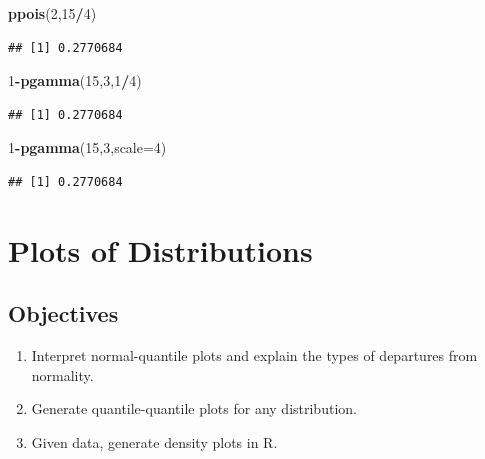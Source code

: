 \documentclass[]{book}
\newenvironment{Shaded}{\begin{snugshade}}{\end{snugshade}}
\newcommand{\KeywordTok}[1]{\textcolor[rgb]{0.13,0.29,0.53}{\textbf{#1}}}
\newcommand{\DataTypeTok}[1]{\textcolor[rgb]{0.13,0.29,0.53}{#1}}
\newcommand{\DecValTok}[1]{\textcolor[rgb]{0.00,0.00,0.81}{#1}}
\newcommand{\OperatorTok}[1]{\textcolor[rgb]{0.81,0.36,0.00}{\textbf{#1}}}
\newcommand{\NormalTok}[1]{#1}
\providecommand{\tightlist}{%
  \setlength{\itemsep}{0pt}\setlength{\parskip}{0pt}}
\theoremstyle{definition}
\theoremstyle{definition}
\theoremstyle{definition}
\theoremstyle{remark}
\begin{document}
\begin{Shaded}
\begin{Highlighting}[]
\KeywordTok{ppois}\NormalTok{(}\DecValTok{2}\NormalTok{,}\DecValTok{15}\OperatorTok{/}\DecValTok{4}\NormalTok{)}
\end{Highlighting}
\end{Shaded}

\begin{verbatim}
## [1] 0.2770684
\end{verbatim}

\begin{Shaded}
\begin{Highlighting}[]
\DecValTok{1}\OperatorTok{-}\KeywordTok{pgamma}\NormalTok{(}\DecValTok{15}\NormalTok{,}\DecValTok{3}\NormalTok{,}\DecValTok{1}\OperatorTok{/}\DecValTok{4}\NormalTok{)}
\end{Highlighting}
\end{Shaded}

\begin{verbatim}
## [1] 0.2770684
\end{verbatim}

\begin{Shaded}
\begin{Highlighting}[]
\DecValTok{1}\OperatorTok{-}\KeywordTok{pgamma}\NormalTok{(}\DecValTok{15}\NormalTok{,}\DecValTok{3}\NormalTok{,}\DataTypeTok{scale=}\DecValTok{4}\NormalTok{)}
\end{Highlighting}
\end{Shaded}

\begin{verbatim}
## [1] 0.2770684
\end{verbatim}

\hypertarget{L16}{\section{Plots of Distributions}\label{L16}}

\subsection{Objectives}\label{objectives-15}

\begin{enumerate}
\def\labelenumi{\arabic{enumi}.}
\tightlist
\item
  Interpret normal-quantile plots and explain the types of departures
  from normality.\\
\item
  Generate quantile-quantile plots for any distribution.\\
\item
  Given data, generate density plots in R.
\end{enumerate}
\end{document}
